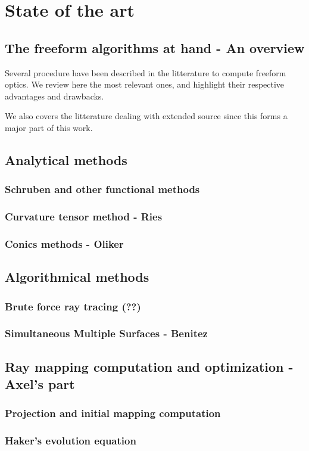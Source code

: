 \chapter{State of the art}
\label{ch:soa}

\section{The freeform algorithms at hand - An overview}
Several procedure have been described in the litterature to compute 
freeform optics. We review here the most relevant ones, and highlight
their respective advantages and drawbacks.

We also covers the litterature dealing with extended source since this 
forms a major part of this work.

\section{Analytical methods}
\subsection{Schruben and other functional methods}

\subsection{Curvature tensor method - Ries}

\subsection{Conics methods - Oliker}

\section{Algorithmical methods}
\subsection{Brute force ray tracing (??) }
\subsection{Simultaneous Multiple Surfaces - Benitez}


\section{Ray mapping computation and optimization - Axel's part}
\subsection{Projection and initial mapping computation}

\subsection{Haker's evolution equation}




